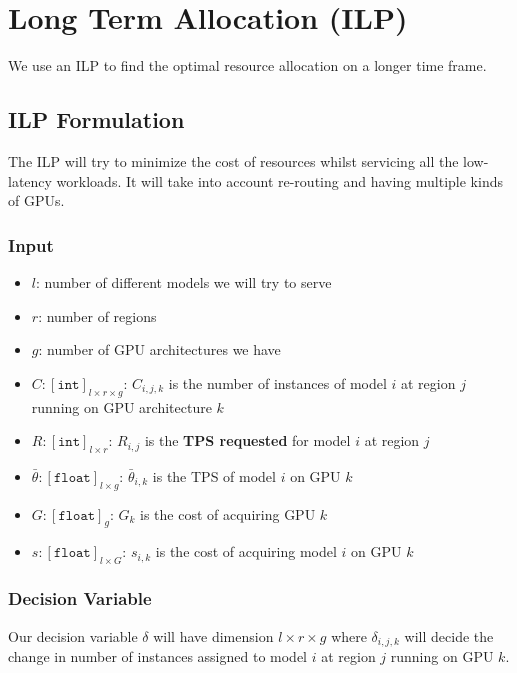 

\newpage
\section{Long Term Allocation (ILP)} \label{sec:ILP_dummy}
We use an ILP to find the optimal resource allocation on a longer time frame.
\subsection{ILP Formulation}
The ILP will try to minimize the cost of resources whilst servicing all the low-latency workloads. It will take into account re-routing and having multiple kinds of GPUs.
\subsubsection{Input}
\begin{itemize}
    \item $l$: number of different models we will try to serve
    \item $r$: number of regions
    \item $g$: number of GPU architectures we have
    \item $C: [\texttt{int}]_{l\times r\times g}$: $C_{i, j, k}$ is the number of instances of model $i$ at region $j$ running on GPU architecture $k$
    \item $R: [\texttt{int}]_{l\times r}$: $R_{i, j}$ is the \textbf{TPS requested} for model $i$ at region $j$ 
    \item $\bar{\theta}: [\texttt{float}]_{l\times g}$: $\bar{\theta}_{i, k}$ is the TPS of model $i$ on GPU $k$
    \item $G: [\texttt{float}]_{g}$: $G_{k}$ is the cost of acquiring GPU $k$
    \item $s: [\texttt{float}]_{l\times G}$: $s_{i, k}$ is the cost of acquiring model $i$ on GPU $k$
\end{itemize}
\subsubsection{Decision Variable}
Our decision variable $\delta$ will have dimension $l\times r\times g$ where $\delta_{i,j,k}$ will decide the change in number of instances assigned to model $i$ at region $j$ running on GPU $k$. 
